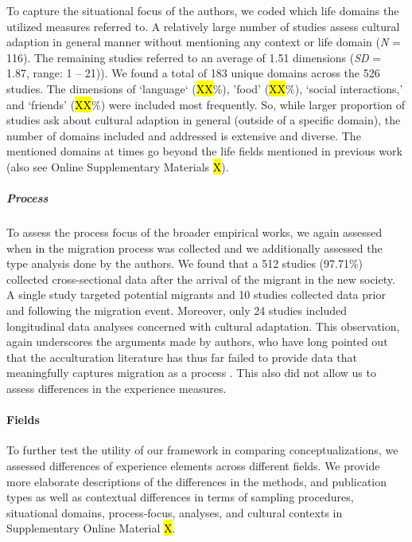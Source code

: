 To capture the situational focus of the authors, we coded which life
domains the utilized measures referred to. A relatively large number of
studies assess cultural adaption in general manner without mentioning
any context or life domain (\textit{N} = 116). The remaining studies
referred to an average of 1.51 dimensions (\textit{SD} = 1.87, range: 1
-- 21)). We found a total of 183 unique domains across the 526 studies.
The dimensions of `language` (\hl{XX}\%), 'food' (\hl{XX}\%), `social
interactions,' and `friends' (\hl{XX}\%) were included most frequently.
So, while larger proportion of studies ask about cultural adaption in
general (outside of a specific domain), the number of domains included
and addressed is extensive and diverse. The mentioned domains at times
go beyond the life fields mentioned in previous work (also see Online
Supplementary Materials \hl{X}).

\subparagraph{Process}

To assess the process focus of the broader empirical works, we again
assessed when in the migration process was collected and we additionally
assessed the type analysis done by the authors. We found that a 512
studies (97.71\%) collected cross-sectional data after the arrival of
the migrant in the new society. A single study targeted potential
migrants and 10 studies collected data prior and following the migration
event. Moreover, only 24 studies included longitudinal data analyses
concerned with cultural adaptation. This observation, again underscores
the arguments made by authors, who have long pointed out that the
acculturation literature has thus far failed to provide data that
meaningfully captures migration as a process
\citep[e.g.,][]{Brown2011, Ward2019}. This also did not allow us to
assess differences in the experience measures.

\paragraph{Fields}

To further test the utility of our framework in comparing
conceptualizations, we assessed differences of experience elements
across different fields. We provide more elaborate descriptions of the
differences in the methods, and publication types as well as contextual
differences in terms of sampling procedures, situational domains,
process-focus, analyses, and cultural contexts in Supplementary Online
Material \hl{X}.

